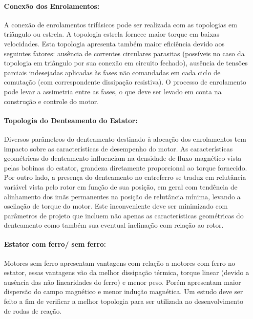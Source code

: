 \paragraph{Conexão dos Enrolamentos:}\label{sec:motor:conexão}

A conexão de enrolamentos trifásicos pode ser realizada com as topologias em triângulo ou estrela. A topologia estrela fornece maior torque em baixas velocidades. Esta topologia apresenta também maior eficiência devido aos seguintes fatores: ausência de correntes circulares parasitas (possíveis no caso da topologia em triângulo por sua conexão em circuito fechado), ausência de tensões parciais indesejadas aplicadas às fases não comandadas em cada ciclo de comutação (com correspondente dissipação resistiva). O processo de enrolamento pode levar a assimetria entre as fases, o que deve ser levado em conta na construção e controle do motor.

\paragraph{Topologia do Denteamento do Estator:}\label{sec:motor:denteamento}

Diversos parâmetros do denteamento destinado à alocação dos enrolamentos tem impacto sobre as características de desempenho do motor. As características geométricas do denteamento influenciam na densidade de fluxo magnético vista pelas bobinas do estator, grandeza diretamente proporcional ao torque fornecido. Por outro lado, a presença do denteamento no entreferro se traduz em relutância variável vista pelo rotor em função de sua posição, em geral com tendência de alinhamento dos imãs permanentes na posição de relutância mínima, levando a oscilação de torque do motor. Este inconveniente deve ser minimizado com parâmetros de projeto que incluem não apenas as características geométricas do denteamento como também sua eventual inclinação com relação ao rotor.
	
\paragraph{Estator com ferro/ sem ferro:}\label{sec:motor:ferro}

Motores sem ferro apresentam vantagens com relação a motores com ferro no estator, essas vantagens vão da melhor dissipação térmica, torque linear (devido a ausência das não linearidades do ferro) e menor peso. Porém apresentam maior dispersão do campo magnético e menor indução magnética. Um estudo deve ser feito a fim de verificar a melhor topologia para ser utilizada no desenvolvimento de rodas de reação.

